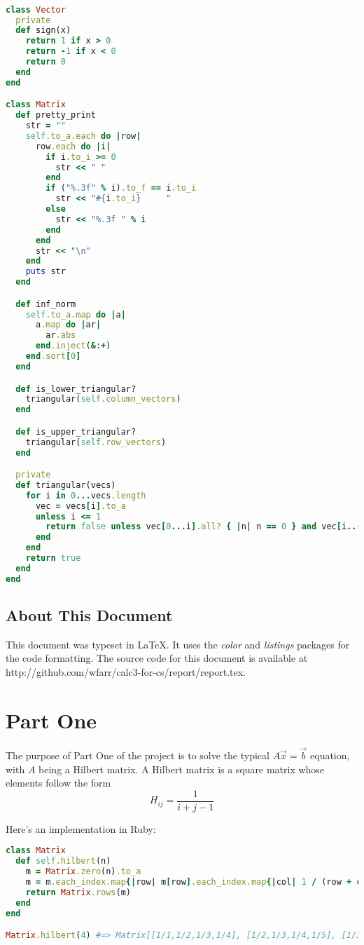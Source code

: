 \documentclass[letterpaper,11pt]{article}
\begin{document}
\lstset{caption=Common Code for All Three Parts}
\begin{lstlisting}[language=ruby]

class Vector
  private
  def sign(x)
    return 1 if x > 0
    return -1 if x < 0
    return 0
  end
end

class Matrix
  def pretty_print
    str = ""
    self.to_a.each do |row|
      row.each do |i|
        if i.to_i >= 0
          str << " "
        end
        if ("%.3f" % i).to_f == i.to_i
          str << "#{i.to_i}     "
        else
          str << "%.3f " % i
        end
      end
      str << "\n"
    end
    puts str
  end

  def inf_norm
    self.to_a.map do |a|
      a.map do |ar|
        ar.abs
      end.inject(&:+)
    end.sort[0]
  end

  def is_lower_triangular?
    triangular(self.column_vectors)
  end

  def is_upper_triangular?
    triangular(self.row_vectors)
  end

  private
  def triangular(vecs)
    for i in 0...vecs.length
      vec = vecs[i].to_a
      unless i <= 1
        return false unless vec[0...i].all? { |n| n == 0 } and vec[i..-1].all? { |n| n != 0 }
      end
    end
    return true
  end
end
\end{lstlisting}

\subsection{About This Document}

This document was typeset in \LaTeX.
It uses the \textit{color} and \textit{listings} packages for the code formatting.
The source code for this document is available at http://github.com/wfarr/calc3-for-cs/report/report.tex.

\newpage
\section{Part One}


The purpose of Part One of the project is to solve the typical $A\vec{x} = \vec{b}$ equation, with $A$ being a Hilbert matrix.
A Hilbert matrix is a square matrix whose elements follow the form $$H_{ij} = \frac{1}{i + j - 1}$$

Here's an implementation in Ruby:

\lstset{caption=Hilbert Matrix Implementation}
\begin{lstlisting}[language=ruby]
class Matrix
  def self.hilbert(n)
    m = Matrix.zero(n).to_a
    m = m.each_index.map{|row| m[row].each_index.map{|col| 1 / (row + col + 1)}}
    return Matrix.rows(m)
  end
end

Matrix.hilbert(4) #=> Matrix[[1/1,1/2,1/3,1/4], [1/2,1/3,1/4,1/5], [1/3,1/4,1/5,1/6], [1/4,1/5,1/6,1/7]]
\end{lstlisting}
\end{document}
